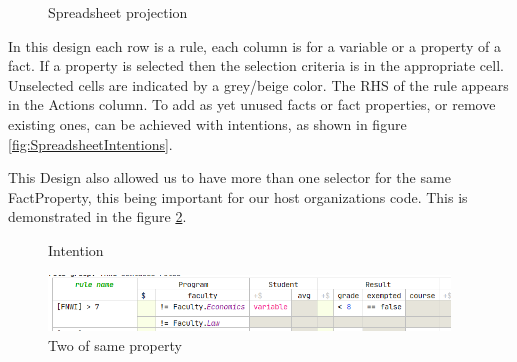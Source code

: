 \begin{figure}[h]
    \centering
    \caption{Spreadsheet projection}
    \label{fig:SpreadsheetProjection}
\end{figure}

In this design each row is a rule, each column is for a variable or a property of a fact.
If a property is selected then the selection criteria is in the appropriate cell.
Unselected cells are indicated by a grey/beige color.
The RHS of the rule appears in the Actions column.
To add as yet unused facts or fact properties, or remove existing ones, can be achieved with intentions, as shown in figure \ref{fig:SpreadsheetIntentions}.

This Design also allowed us to have more than one selector for the same FactProperty, this being important for our host organizations code.
This is demonstrated in the figure \ref{fig:TwoProperties}.

\begin{figure}
    \centering
    \begin{minipage}{0.35\textwidth}
        \centering
        \caption{Intention}
        \label{fig:SpreadsheetIntentions}
    \end{minipage}\hfill
    \begin{minipage}{0.65\textwidth}
        \centering
        \includegraphics[width=0.95\textwidth]{Sections/images/spreadsheetTwoProperties.png} 
        \caption{Two of same property}
        \label{fig:TwoProperties}
    \end{minipage}
\end{figure}

